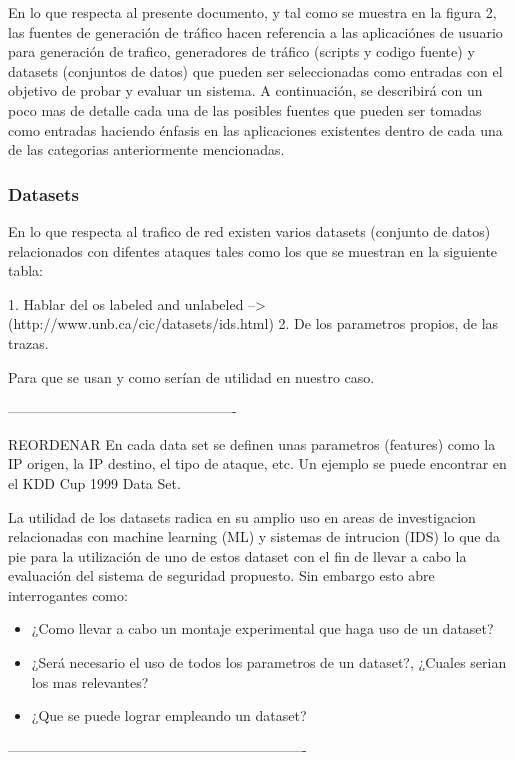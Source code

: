 \documentclass[12pt]{article}
\begin{document}
En lo que respecta al presente documento, y tal como se muestra en la figura 2, las fuentes de generación de tráfico hacen referencia a las aplicaciónes de usuario para generación de trafico, generadores de tráfico (scripts y codigo fuente) y datasets (conjuntos de datos) que pueden ser seleccionadas como entradas con el objetivo de probar y evaluar un sistema. A continuación, se describirá con un poco mas de detalle cada una de las posibles fuentes que pueden ser tomadas como entradas haciendo énfasis en las aplicaciones existentes dentro de cada una de las categorias anteriormente mencionadas.

\subsubsection{Datasets}

En lo que respecta al trafico de red existen varios datasets (conjunto de datos) relacionados con difentes ataques tales como los que se muestran en la siguiente tabla:


1. Hablar del os labeled and unlabeled --> (http://www.unb.ca/cic/datasets/ids.html)
2. De los parametros propios, de las trazas.

Para que se usan y como serían de utilidad en nuestro caso.



-------------------------------------------------

REORDENAR
En cada data set se definen unas parametros (features) como la IP origen, la IP destino, el tipo de ataque, etc. Un ejemplo se puede encontrar en el KDD Cup 1999 Data Set\citep{kdd_desc, CIDDS-001}.

La utilidad de los datasets radica en su amplio uso en areas de investigacion relacionadas con machine learning (ML) y sistemas de intrucion (IDS) \citep{using_kdd} lo que da pie para la utilización de uno de estos dataset con el fin de llevar a cabo la evaluación del sistema de seguridad propuesto. Sin embargo esto abre interrogantes como:
\begin{itemize}
\item ¿Como llevar a cabo un montaje experimental que haga uso de un dataset?
\item ¿Será necesario el uso de todos los parametros de un dataset?, ¿Cuales serian los mas relevantes? 
\item ¿Que se puede lograr empleando un dataset?
\end{itemize}
----------------------------------------------------------------
\end{document}
